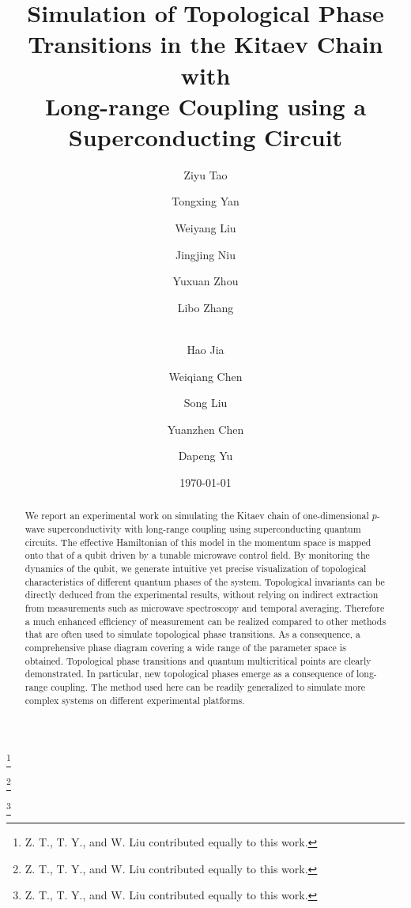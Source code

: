 \documentclass[aps,reprint,groupedaddress,showpacs,superscriptaddress]{revtex4-1}
\begin{document}
\title{Simulation of Topological Phase Transitions in the Kitaev Chain with \\Long-range Coupling using a Superconducting Circuit}

\author{Ziyu Tao}
\thanks{Z. T., T. Y., and W. Liu contributed equally to this work.}
\author{Tongxing Yan}
\thanks{Z. T., T. Y., and W. Liu contributed equally to this work.}
\author{Weiyang Liu}
\thanks{Z. T., T. Y., and W. Liu contributed equally to this work.}
\author{Jingjing Niu}
\author{Yuxuan Zhou}
\author{Libo Zhang}
\author{\\Hao Jia}
\author{Weiqiang Chen}
\author{Song Liu}
\author{Yuanzhen Chen}
\author{Dapeng Yu}


\date{\today }

\begin{abstract}
We report an experimental work on simulating the Kitaev chain of one-dimensional $p$-wave superconductivity with long-range coupling using superconducting quantum circuits. The effective Hamiltonian of this model in the momentum space is mapped onto that of a qubit driven by a tunable microwave control field. By monitoring the dynamics of the qubit, we generate intuitive yet precise visualization of topological characteristics of different quantum phases of the system. Topological invariants can be directly deduced from the experimental results, without relying on indirect extraction from measurements such as microwave spectroscopy and temporal averaging. Therefore a much enhanced efficiency of measurement can be realized compared to other methods that are often used to simulate topological phase transitions. As a consequence, a comprehensive phase diagram covering a wide range of the parameter space is obtained. Topological phase transitions and quantum multicritical points are clearly demonstrated. In particular, new topological phases emerge as a consequence of long-range coupling. The method used here can be readily generalized to simulate more complex systems on different experimental platforms. 

\end{abstract}

\vskip 0.5cm
\maketitle
\end{document}
